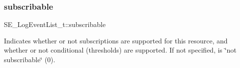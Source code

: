 \subsubsection{\texorpdfstring{subscribable}{subscribable}}
{\footnotesize\ttfamily S\+E\+\_\+\+Log\+Event\+List\+\_\+t\+::subscribable}

Indicates whether or not subscriptions are supported for this resource, and whether or not conditional (thresholds) are supported. If not specified, is \char`\"{}not subscribable\char`\"{} (0). 